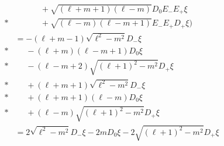 \begin{align*}
           &\phantom{{}={}()}{} + \sqrt{(\ell+m+1)(\ell-m)}D_0E_-E_+\xi \\*
           &\phantom{{}={}()}{} + \sqrt{(\ell-m)(\ell-m+1)} E_-E_+D_+ \xi \Bigr) \\
           &= -(\ell+m-1)\sqrt{\ell^2-m^2} D_- \xi \\*
           &\phantom{{}={}}{} - (\ell+m)(\ell-m+1) D_0 \xi \\*
           &\phantom{{}={}}{} - (\ell-m+2)\sqrt{(\ell+1)^2-m^2} D_+ \xi \\*
           &\phantom{{}={}}{} + (\ell+m+1)\sqrt{\ell^2-m^2}D_-\xi \\*
           &\phantom{{}={}}{} + (\ell+m+1)(\ell-m)D_0\xi \\*
           &\phantom{{}={}}{} + (\ell-m)\sqrt{(\ell+1)^2-m^2} D_+ \xi \\
           &= 2\sqrt{\ell^2-m^2}D_-\xi - 2m D_0\xi -2\sqrt{(\ell+1)^2-m^2}D_+\xi
\end{align*}

